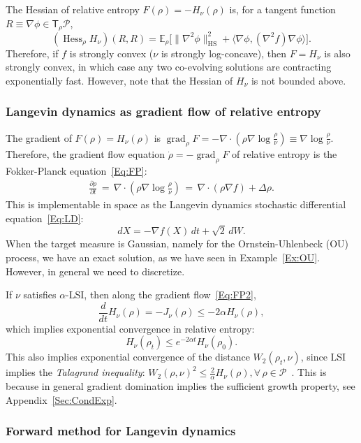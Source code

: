 \documentclass[final,12pt]{colt2018}
\newcommand{\E}{\mathbb{E}}
\newcommand{\HS}{\mathrm{HS}}
\renewcommand{\part}[2]{\frac{\partial #1}{\partial #2}}
\DeclareMathOperator{\grad}{grad}
\DeclareMathOperator{\Hess}{Hess}
\newcommand{\T}{\mathsf{T}}
\renewcommand{\P}{\mathcal{P}}
\begin{document}
The Hessian of relative entropy $F(\rho) = -H_\nu(\rho)$ is, for a tangent function $R \equiv \nabla \phi \in \T_\rho \P$,
$$(\Hess_\rho H_\nu)(R,R) = \E_\rho \big[\|\nabla^2 \phi\|^2_{\HS} + \langle \nabla \phi, (\nabla^2 f) \nabla \phi \rangle \big].$$
Therefore, if $f$ is strongly convex ($\nu$ is strongly log-concave), then $F = H_\nu$ is also strongly convex, in which case any two co-evolving solutions are contracting exponentially fast.
However, note that the Hessian of $H_\nu$ is not bounded above.


\subsubsection{Langevin dynamics as gradient flow of relative entropy}

The gradient of $F(\rho) = H_\nu(\rho)$ is $\grad_\rho F = -\nabla \cdot (\rho \nabla \log \frac{\rho}{\nu}) \equiv \nabla \log \frac{\rho}{\nu}$.
Therefore, the gradient flow equation $\dot \rho = -\grad_\rho F$ of relative entropy is the Fokker-Planck equation~\eqref{Eq:FP}:
\begin{align}\label{Eq:FP2}
\part{\rho}{t} \,=\, \nabla \cdot \left(\rho \nabla \log \frac{\rho}{\nu}\right) \,=\, \nabla \cdot (\rho \nabla f) + \Delta \rho.\end{align}
This is implementable in space as the Langevin dynamics stochastic differential equation~\eqref{Eq:LD}:
$$dX = -\nabla f(X) \, dt + \sqrt{2} \, dW.$$
When the target measure is Gaussian, namely for the Ornstein-Uhlenbeck (OU) process, we have an exact solution, as we have seen in Example~\ref{Ex:OU}. 
However, in general we need to discretize.

If $\nu$ satisfies $\alpha$-LSI, then along the gradient flow~\eqref{Eq:FP2}, 
$$\frac{d}{dt} H_\nu(\rho) = -J_\nu(\rho) \le -2\alpha H_\nu(\rho),$$
which implies exponential convergence in relative entropy: 
$$H_\nu(\rho_t) \le e^{-2\alpha t} H_\nu(\rho_0).$$
This also implies exponential convergence of the distance $W_2(\rho_t,\nu)$, since LSI implies the 
{\em Talagrand inequality}:
$W_2(\rho,\nu)^2 \le \frac{2}{\alpha} H_\nu(\rho), \forall\,\rho \in \P$~\cite[]{T96,OV00}.
This is because in general gradient domination implies the sufficient growth property, see Appendix~\ref{Sec:CondExp}.



\subsubsection{Forward method for Langevin dynamics}
\label{Sec:FLang}
\end{document}
